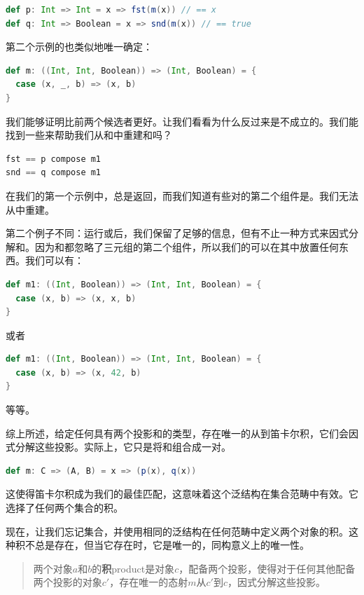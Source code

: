 \begin{lstlisting}[language=Scala]
def p: Int => Int = x => fst(m(x)) // == x
def q: Int => Boolean = x => snd(m(x)) // == true
\end{lstlisting}
第二个示例的也类似地唯一确定：

\begin{lstlisting}[language=Scala]
def m: ((Int, Int, Boolean)) => (Int, Boolean) = {
  case (x, _, b) => (x, b)
}
\end{lstlisting}
我们能够证明比前两个候选者更好。让我们看看为什么反过来是不成立的。我们能找到一些来帮助我们从和中重建和吗？

\begin{lstlisting}[language=Scala]
fst == p compose m1
snd == q compose m1
\end{lstlisting}
在我们的第一个示例中，总是返回，而我们知道有些对的第二个组件是。我们无法从中重建。

第二个例子不同：运行或后，我们保留了足够的信息，但有不止一种方式来因式分解和。因为和都忽略了三元组的第二个组件，所以我们的可以在其中放置任何东西。我们可以有：

\begin{lstlisting}[language=Scala]
def m1: ((Int, Boolean)) => (Int, Int, Boolean) = {
  case (x, b) => (x, x, b)
}
\end{lstlisting}

或者
\begin{lstlisting}[language=Scala]
def m1: ((Int, Boolean)) => (Int, Int, Boolean) = {
  case (x, b) => (x, 42, b)
}
\end{lstlisting}
等等。

综上所述，给定任何具有两个投影和的类型，存在唯一的从到笛卡尔积，它们会因式分解这些投影。实际上，它只是将和组合成一对。

\begin{lstlisting}[language=Scala]
def m: C => (A, B) = x => (p(x), q(x))
\end{lstlisting}
这使得笛卡尔积成为我们的最佳匹配，这意味着这个泛结构在集合范畴中有效。它选择了任何两个集合的积。

现在，让我们忘记集合，并使用相同的泛结构在任何范畴中定义两个对象的积。这种积不总是存在，但当它存在时，它是唯一的，同构意义上的唯一性。

\begin{quote}
  两个对象$a$和$b$的\textbf{积}{product}是对象$c$，配备两个投影，使得对于任何其他配备两个投影的对象$c'$，存在唯一的态射$m$从$c'$到$c$，因式分解这些投影。
\end{quote}

